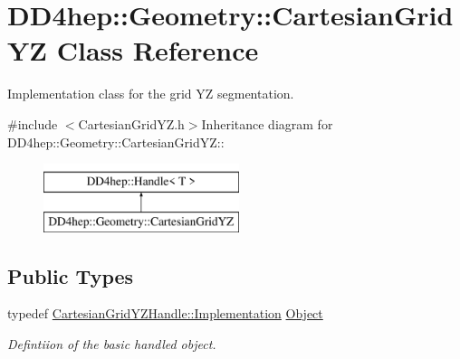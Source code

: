 \hypertarget{class_d_d4hep_1_1_geometry_1_1_cartesian_grid_y_z}{
\section{DD4hep::Geometry::CartesianGridYZ Class Reference}
\label{class_d_d4hep_1_1_geometry_1_1_cartesian_grid_y_z}
}


Implementation class for the grid YZ segmentation.  


{\ttfamily \#include $<$CartesianGridYZ.h$>$}Inheritance diagram for DD4hep::Geometry::CartesianGridYZ::\begin{figure}[H]
\begin{center}
\leavevmode
\includegraphics[height=2cm]{class_d_d4hep_1_1_geometry_1_1_cartesian_grid_y_z}
\end{center}
\end{figure}
\subsection*{Public Types}
\begin{DoxyCompactItemize}
\item 
typedef \hyperlink{class_t}{CartesianGridYZHandle::Implementation} \hyperlink{class_d_d4hep_1_1_geometry_1_1_cartesian_grid_y_z_ad5db30e8623d30e9f23f0c4f8e0b546e}{Object}
\begin{DoxyCompactList}\small\item\em Defintiion of the basic handled object. \item\end{DoxyCompactList}\end{DoxyCompactItemize}

